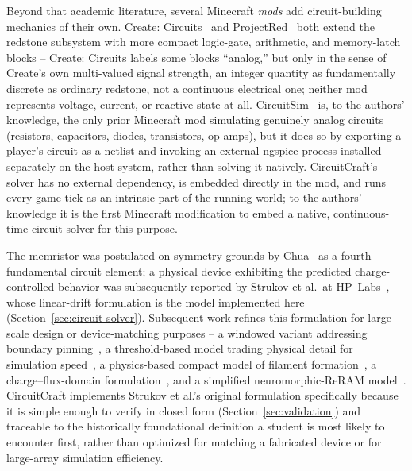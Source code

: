 Beyond that academic literature, several Minecraft \emph{mods} add circuit-building
mechanics of their own. Create: Circuits~\cite{chocoboyy2026createcircuits} and
ProjectRed~\cite{mrtjp2026projectred} both extend the redstone subsystem with more compact
logic-gate, arithmetic, and memory-latch blocks -- Create: Circuits labels some blocks
``analog,'' but only in the sense of Create's own multi-valued signal strength, an integer
quantity as fundamentally discrete as ordinary redstone, not a continuous electrical one;
neither mod represents voltage, current, or reactive state at all.
CircuitSim~\cite{dankov2026circuitsim} is, to the authors' knowledge, the only prior
Minecraft mod simulating genuinely analog circuits (resistors, capacitors, diodes,
transistors, op-amps), but it does so by exporting a player's circuit as a netlist and
invoking an external ngspice process installed separately on the host system, rather than
solving it natively. CircuitCraft's solver has no external dependency, is embedded directly
in the mod, and runs every game tick as an intrinsic part of the running world; to the
authors' knowledge it is the first Minecraft modification to embed a native, continuous-time
circuit solver for this purpose.

The memristor was postulated on symmetry grounds by Chua~\cite{chua1971memristor} as a
fourth fundamental circuit element; a physical device exhibiting the predicted
charge-controlled behavior was subsequently reported by Strukov et al.\ at
HP~Labs~\cite{strukov2008missing}, whose linear-drift formulation is the model implemented
here (Section~\ref{sec:circuit-solver}). Subsequent work refines this formulation for
large-scale design or device-matching purposes -- a windowed variant addressing boundary
pinning~\cite{biolek2009spice}, a threshold-based model trading physical detail for
simulation speed~\cite{kvatinsky2013team}, a physics-based compact model of filament
formation~\cite{guan2012compact}, a charge--flux-domain formulation~\cite{picos2015chargeflux},
and a simplified neuromorphic-ReRAM model~\cite{alchawa2020simple}. CircuitCraft implements
Strukov et al.'s original formulation specifically because it is simple enough to verify in
closed form (Section~\ref{sec:validation}) and traceable to the historically foundational
definition a student is most likely to encounter first, rather than optimized for matching a
fabricated device or for large-array simulation efficiency.
